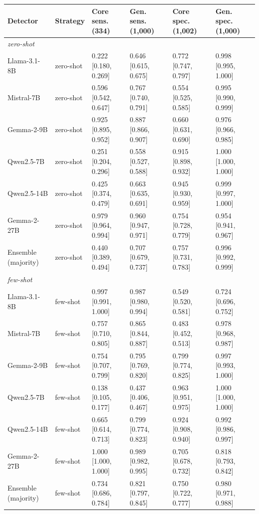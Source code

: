 \begin{tabular}{llllll}
\toprule
Detector & Strategy & Core sens. (334) & Gen. sens. (1,000) & Core spec. (1,002) & Gen. spec. (1,000) \\
\midrule
\multicolumn{6}{l}{\textit{zero-shot}} \\
Llama-3.1-8B & zero-shot & 0.222 [0.180, 0.269] & 0.646 [0.615, 0.675] & 0.772 [0.747, 0.797] & 0.998 [0.995, 1.000] \\
Mistral-7B & zero-shot & 0.596 [0.542, 0.647] & 0.767 [0.740, 0.791] & 0.554 [0.525, 0.585] & 0.995 [0.990, 0.999] \\
Gemma-2-9B & zero-shot & 0.925 [0.895, 0.952] & 0.887 [0.866, 0.907] & 0.660 [0.631, 0.690] & 0.976 [0.966, 0.985] \\
Qwen2.5-7B & zero-shot & 0.251 [0.204, 0.296] & 0.558 [0.527, 0.588] & 0.915 [0.898, 0.932] & 1.000 [1.000, 1.000] \\
Qwen2.5-14B & zero-shot & 0.425 [0.374, 0.479] & 0.663 [0.635, 0.691] & 0.945 [0.930, 0.959] & 0.999 [0.997, 1.000] \\
Gemma-2-27B & zero-shot & 0.979 [0.964, 0.994] & 0.960 [0.947, 0.971] & 0.754 [0.728, 0.779] & 0.954 [0.941, 0.967] \\
Ensemble (majority) & zero-shot & 0.440 [0.389, 0.494] & 0.707 [0.679, 0.737] & 0.757 [0.731, 0.783] & 0.996 [0.992, 0.999] \\
\midrule
\multicolumn{6}{l}{\textit{few-shot}} \\
Llama-3.1-8B & few-shot & 0.997 [0.991, 1.000] & 0.987 [0.980, 0.994] & 0.549 [0.520, 0.581] & 0.724 [0.696, 0.752] \\
Mistral-7B & few-shot & 0.757 [0.710, 0.805] & 0.865 [0.844, 0.887] & 0.483 [0.452, 0.513] & 0.978 [0.968, 0.987] \\
Gemma-2-9B & few-shot & 0.754 [0.707, 0.799] & 0.795 [0.769, 0.820] & 0.799 [0.774, 0.825] & 0.997 [0.993, 1.000] \\
Qwen2.5-7B & few-shot & 0.138 [0.105, 0.177] & 0.437 [0.406, 0.467] & 0.963 [0.951, 0.975] & 1.000 [1.000, 1.000] \\
Qwen2.5-14B & few-shot & 0.665 [0.614, 0.713] & 0.799 [0.774, 0.823] & 0.924 [0.908, 0.940] & 0.992 [0.986, 0.997] \\
Gemma-2-27B & few-shot & 1.000 [1.000, 1.000] & 0.989 [0.982, 0.995] & 0.705 [0.678, 0.732] & 0.818 [0.793, 0.842] \\
Ensemble (majority) & few-shot & 0.734 [0.686, 0.784] & 0.821 [0.797, 0.845] & 0.750 [0.722, 0.777] & 0.980 [0.971, 0.988] \\

\end{tabular}

